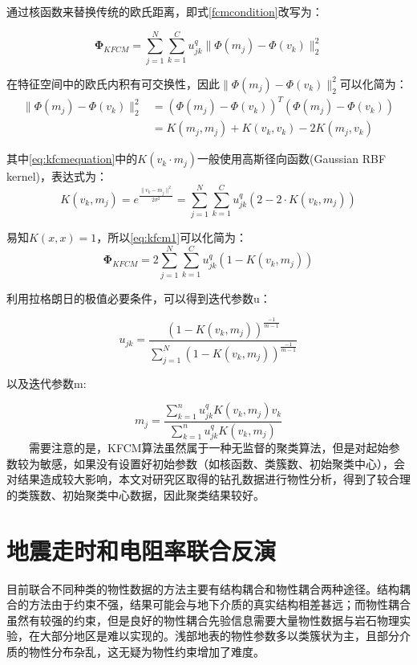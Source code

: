 通过核函数来替换传统的欧氏距离，即式\ref{fcmcondition}改写为：

\begin{equation}
    \mathbf{\Phi}_{KFCM} = \sum_{j=1}^{N}\sum_{k=1}^Cu_{jk}^q\|\Phi(m_j)-\Phi(v_k)\|_2^2 
    \label{eq:kfcmequation}
\end{equation}

在特征空间中的欧氏内积有可交换性，因此$\|\Phi(m_j)-\Phi(v_k)\|_2^2$可以化简为：
\begin{eqnarray}
    \|\Phi(m_j)-\Phi(v_k)\|_2^2 &= (\Phi(m_j)-\Phi(v_k))^T(\Phi(m_j)-\Phi(v_k))\nonumber \\
    &=K(m_j, m_j)+K(v_k, v_k) - 2K(m_j, v_k)
    \label{eq:kfcm1}
\end{eqnarray}

其中\ref{eq:kfcmequation}中的$K(v_k\cdot m_j)$一般使用高斯径向函数(Gaussian RBF kernel)，表达式为：
\begin{equation}
    K(v_k, m_j) = e^{\frac{\|v_k-m_j\|^2}{2\sigma^2}}  = \sum_{j=1}^{N}\sum_{k=1}^Cu_{jk}^q(2-2\cdot K(v_k, m_j))
\end{equation}

易知$K(x,x)=1$，所以\ref{eq:kfcm1}可以化简为：
\begin{equation}
   \mathbf{\Phi}_{KFCM} = 2\sum_{j=1}^{N}\sum_{k=1}^Cu_{jk}^q(1-K(v_k, m_j))
\end{equation}

利用拉格朗日的极值必要条件，可以得到迭代参数u：

\begin{equation}
    u_{jk} = \frac{(1-K(v_k, m_j))^{\frac{-1}{m-1}}}{\sum_{j=1}^N(1-K(v_k, m_j))^{\frac{-1}{m-1}}}
\end{equation}

以及迭代参数m:

\begin{equation}
    m_j=\frac{\sum_{k=1}^nu_{jk}^qK(v_k, m_j)v_k}{\sum_{k=1}^nu_{jk}^qK(v_k, m_j)}
\end{equation}
\ \ \ \ 需要注意的是，KFCM算法虽然属于一种无监督的聚类算法，但是对起始参数较为敏感，如果没有设置好初始参数（如核函数、类簇数、初始聚类中心），会对结果造成较大影响，本文对研究区取得的钻孔数据进行物性分析，得到了较合理的类簇数、初始聚类中心数据，因此聚类结果较好。

\newpage
\section{地震走时和电阻率联合反演}

目前联合不同种类的物性数据的方法主要有结构耦合和物性耦合两种途径。结构耦合的方法由于约束不强，结果可能会与地下介质的真实结构相差甚远；而物性耦合虽然有较强的约束，但是良好的物性耦合先验信息需要大量物性数据与岩石物理实验，在大部分地区是难以实现的。浅部地表的物性参数多以类簇状为主，且部分介质的物性分布杂乱，这无疑为物性约束增加了难度。

